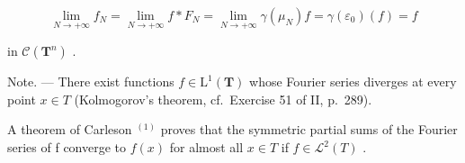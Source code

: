 \[
\lim _ {N \to + \infty} f _ {N} = \lim _ {N \to + \infty} f * F _ {N} = \lim _ {N \to + \infty} \gamma (\mu_ {N}) f = \gamma (\varepsilon_ {0}) (f) = f
\]

in \(\mathcal{C}(\mathbf{T}^n)\) .

Note. --- There exist functions \(f \in \mathrm{L}^{1}(\mathbf{T})\) whose Fourier series diverges at every point \(x \in T\) (Kolmogorov's theorem, cf.~Exercise 51 of II, p.~289).

A theorem of Carleson \(^{(1)}\) proves that the symmetric partial sums of the Fourier series of f converge to \(f(x)\) for almost all \(x \in T\) if \(f \in \mathcal{L}^{2}(T)\) .

